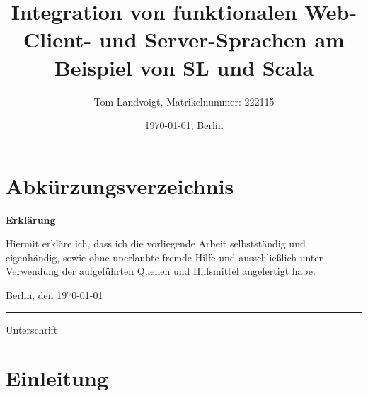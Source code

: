 \documentclass[12pt,bibtotoc]{scrreprt}
\title{Integration von funktionalen Web-Client- und Server-Sprachen am Beispiel von SL und Scala}
\author{Tom Landvoigt, Matrikelnummer: 222115}
\date{\today{}, Berlin}
\begin{document}
\maketitle
\tableofcontents   %
\listoffigures     %
\listoftables      %
\lstlistoflistings %

\chapter*{Abkürzungsverzeichnis}
\begin{acronym}[TU-Berlin]
\setlength{\itemsep}{-0.3\parsep}
 \acro{}{}
\end{acronym}


\newpage
\thispagestyle{empty}		%
\begin{LARGE}
	\textbf{Erklärung}
\end{LARGE}

\vspace{1cm}

Hiermit erkläre ich, dass ich die vorliegende Arbeit selbstständig und eigenhändig, sowie ohne unerlaubte fremde Hilfe und ausschließlich unter Verwendung der aufgeführten Quellen und Hilfsmittel angefertigt habe.
\vspace{2cm}

Berlin, den \today

\vspace{1cm}

\rule{0.3\textwidth}{0.4pt}

Unterschrift

\vspace*{6cm}
\newpage


\lstset{basicstyle=\ttfamily\small, numbers=left, numberstyle=\tiny}

\chapter{Einleitung}
\setcounter{page}{1}
\end{document}

